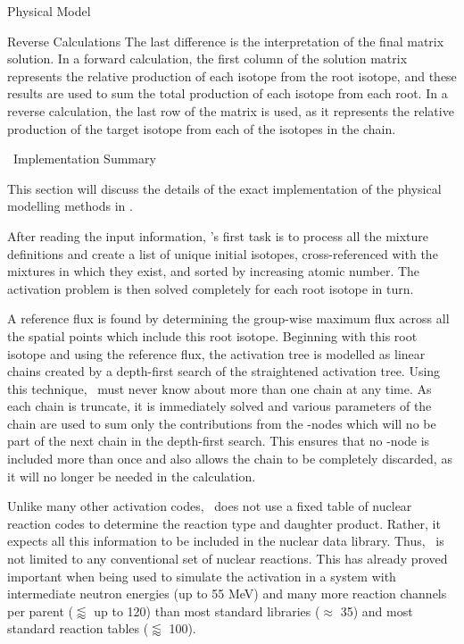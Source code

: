 \begin{chapter}{Physical Model\label{chap:physical}}
\begin{section}{Reverse Calculations}
  The last difference is the interpretation of the final matrix
  solution.  In a forward calculation, the first column of the
  solution matrix represents the relative production of each isotope
  from the root isotope, and these results are used to sum the total
  production of each isotope from each root.  In a reverse
  calculation, the last row of the matrix is used, as it represents
  the relative production of the target isotope from each of the
  isotopes in the chain.

\end{section}

\begin{section}{\ALARA\ Implementation Summary}
  
  This section will discuss the details of the exact implementation of
  the physical modelling methods in \ALARA.
  
  After reading the input information, \ALARA's first task is to
  process all the mixture definitions and create a list of unique
  initial isotopes, cross-referenced with the mixtures in which they
  exist, and sorted by increasing atomic number.  The activation
  problem is then solved completely for each root isotope in turn.
  
  A reference flux is found by determining the group-wise maximum flux
  across all the spatial points which include this root isotope.
  Beginning with this root isotope and using the reference flux, the
  activation tree is modelled as linear chains created by a
  depth-first search of the straightened activation tree.  Using this
  technique, \ALARA\ must never know about more than one chain at any
  time.  As each chain is truncate, it is immediately solved and
  various parameters of the chain are used to sum only the
  contributions from the \pc-nodes which will no be part of the next
  chain in the depth-first search.  This ensures that no \pc-node is
  included more than once and also allows the chain to be completely
  discarded, as it will no longer be needed in the calculation.
  
  Unlike many other activation codes, \ALARA\ does not use a fixed
  table of nuclear reaction codes to determine the reaction type and
  daughter product.  Rather, it expects all this information to be
  included in the nuclear data library.  Thus, \ALARA\ is not limited
  to any conventional set of nuclear reactions.  This has already
  proved important when being used to simulate the activation in a
  system with intermediate neutron energies (up to 55 MeV) and many
  more reaction channels per parent ($\lessapprox$ up to 120) than
  most standard libraries ($\approx$ 35) and most standard reaction
  tables ($\lessapprox$ 100).
  

\end{section}
\end{chapter}
